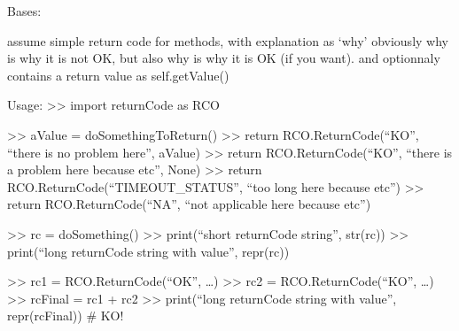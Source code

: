 \documentclass[a4paper,10pt,english]{sphinxmanual}
\begin{document}
\begin{fulllineitems}
\label{\detokenize{apidoc_src/src:src.returnCode.ReturnCode}}
Bases: 

assume simple return code for methods, with explanation as ‘why’
obviously why is why it is not OK, 
but also why is why it is OK (if you want). 
and optionnaly contains a return value as self.getValue()

Usage:
\textgreater{}\textgreater{} import returnCode as RCO

\textgreater{}\textgreater{} aValue = doSomethingToReturn()
\textgreater{}\textgreater{} return RCO.ReturnCode(“KO”, “there is no problem here”, aValue)
\textgreater{}\textgreater{} return RCO.ReturnCode(“KO”, “there is a problem here because etc”, None)
\textgreater{}\textgreater{} return RCO.ReturnCode(“TIMEOUT\_STATUS”, “too long here because etc”)
\textgreater{}\textgreater{} return RCO.ReturnCode(“NA”, “not applicable here because etc”)

\textgreater{}\textgreater{} rc = doSomething()
\textgreater{}\textgreater{} print(“short returnCode string”, str(rc))
\textgreater{}\textgreater{} print(“long returnCode string with value”, repr(rc))

\textgreater{}\textgreater{} rc1 = RCO.ReturnCode(“OK”, …)
\textgreater{}\textgreater{} rc2 = RCO.ReturnCode(“KO”, …)
\textgreater{}\textgreater{} rcFinal = rc1 + rc2
\textgreater{}\textgreater{} print(“long returnCode string with value”, repr(rcFinal)) \# KO!

\begin{fulllineitems}
\label{\detokenize{apidoc_src/src:src.returnCode.ReturnCode.KFSYS}}
\end{fulllineitems}


\begin{fulllineitems}
\label{\detokenize{apidoc_src/src:src.returnCode.ReturnCode.KNOWNFAILURE_STATUS}}
\end{fulllineitems}


\end{fulllineitems}
\end{document}
